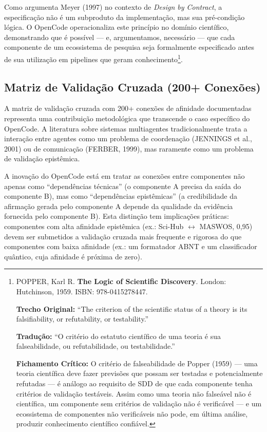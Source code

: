 Como argumenta Meyer (1997) no contexto de \textit{Design by Contract}, a especificação não é um subproduto da implementação, mas sua pré-condição lógica. O OpenCode operacionaliza este princípio no domínio científico, demonstrando que é possível --- e, argumentamos, necessário --- que cada componente de um ecossistema de pesquisa seja formalmente especificado antes de sua utilização em pipelines que geram conhecimento\footnote{
  POPPER, Karl R. \textbf{The Logic of Scientific Discovery}. London: Hutchinson, 1959. ISBN: 978-0415278447.

  \textbf{Trecho Original:} ``The criterion of the scientific status of a theory is its falsifiability, or refutability, or testability.''

  \textbf{Tradução:} ``O critério do estatuto científico de uma teoria é sua falseabilidade, ou refutabilidade, ou testabilidade.''

  \textbf{Fichamento Crítico:} O critério de falseabilidade de Popper (1959) --- uma teoria científica deve fazer previsões que possam ser testadas e potencialmente refutadas --- é análogo ao requisito de SDD de que cada componente tenha critérios de validação testáveis. Assim como uma teoria não falseável não é científica, um componente sem critérios de validação não é verificável --- e um ecossistema de componentes não verificáveis não pode, em última análise, produzir conhecimento científico confiável.
}.

\subsection{Matriz de Validação Cruzada (200+ Conexões)}

A matriz de validação cruzada com 200+ conexões de afinidade documentadas representa uma contribuição metodológica que transcende o caso específico do OpenCode. A literatura sobre sistemas multiagentes tradicionalmente trata a interação entre agentes como um problema de coordenação (JENNINGS et al., 2001) ou de comunicação (FERBER, 1999), mas raramente como um problema de validação epistêmica.

A inovação do OpenCode está em tratar as conexões entre componentes não apenas como ``dependências técnicas'' (o componente A precisa da saída do componente B), mas como ``dependências epistêmicas'' (a credibilidade da afirmação gerada pelo componente A depende da qualidade da evidência fornecida pelo componente B). Esta distinção tem implicações práticas: componentes com alta afinidade epistêmica (ex.: Sci-Hub $\leftrightarrow$ MASWOS, 0,95) devem ser submetidos a validação cruzada mais frequente e rigorosa do que componentes com baixa afinidade (ex.: um formatador ABNT e um classificador quântico, cuja afinidade é próxima de zero).

